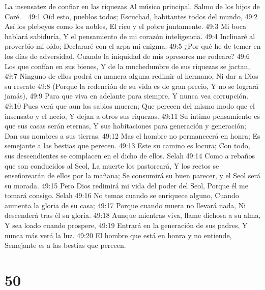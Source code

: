 La insensatez de confiar en las riquezas 
Al músico principal. Salmo de los hijos de Coré. 

49:1 Oíd esto, pueblos todos; 
Escuchad, habitantes todos del mundo, 
49:2 Así los plebeyos como los nobles, 
El rico y el pobre juntamente. 
49:3 Mi boca hablará sabiduría, 
Y el pensamiento de mi corazón inteligencia. 
49:4 Inclinaré al proverbio mi oído; 
Declararé con el arpa mi enigma. 
49:5 ¿Por qué he de temer en los días de adversidad, 
Cuando la iniquidad de mis opresores me rodeare? 
49:6 Los que confían en sus bienes, 
Y de la muchedumbre de sus riquezas se jactan, 
49:7 Ninguno de ellos podrá en manera alguna redimir al hermano, 
Ni dar a Dios su rescate 
49:8 (Porque la redención de su vida es de gran precio, 
Y no se logrará jamás), 
49:9 Para que viva en adelante para siempre, 
Y nunca vea corrupción. 
49:10 Pues verá que aun los sabios mueren; 
Que perecen del mismo modo que el insensato y el necio, 
Y dejan a otros sus riquezas. 
49:11 Su íntimo pensamiento es que sus casas serán eternas, 
Y sus habitaciones para generación y generación; 
Dan sus nombres a sus tierras. 
49:12 Mas el hombre no permanecerá en honra; 
Es semejante a las bestias que perecen. 
49:13 Este su camino es locura; 
Con todo, sus descendientes se complacen en el dicho de ellos. Selah 
49:14 Como a rebaños que son conducidos al Seol, 
La muerte los pastoreará, 
Y los rectos se enseñorearán de ellos por la mañana; 
Se consumirá su buen parecer, y el Seol será su morada. 
49:15 Pero Dios redimirá mi vida del poder del Seol, 
Porque él me tomará consigo. Selah 
49:16 No temas cuando se enriquece alguno, 
Cuando aumenta la gloria de su casa; 
49:17 Porque cuando muera no llevará nada, 
Ni descenderá tras él su gloria. 
49:18 Aunque mientras viva, llame dichosa a su alma, 
Y sea loado cuando prospere, 
49:19 Entrará en la generación de sus padres, 
Y nunca más verá la luz. 
49:20 El hombre que está en honra y no entiende, 
Semejante es a las bestias que perecen. 

\chapter{50}

